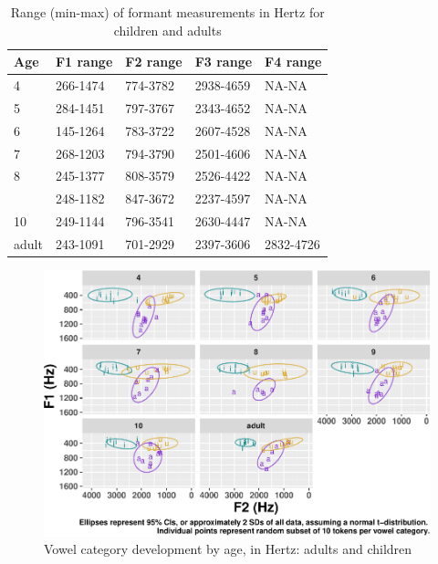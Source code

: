\documentclass[
]{article}
\begin{document}
\begin{table}[!h]

\caption{\label{tab:formant-range-table}Range (min-max) of formant measurements in Hertz for children and adults}
\centering
\begin{tabular}[t]{lllll}
\toprule
Age & F1 range & F2 range & F3 range & F4 range\\
\midrule
4 & 266-1474 & 774-3782 & 2938-4659 & NA-NA\\
5 & 284-1451 & 797-3767 & 2343-4652 & NA-NA\\
6 & 145-1264 & 783-3722 & 2607-4528 & NA-NA\\
7 & 268-1203 & 794-3790 & 2501-4606 & NA-NA\\
8 & 245-1377 & 808-3579 & 2526-4422 & NA-NA\\
\addlinespace
9 & 248-1182 & 847-3672 & 2237-4597 & NA-NA\\
10 & 249-1144 & 796-3541 & 2630-4447 & NA-NA\\
adult & 243-1091 & 701-2929 & 2397-3606 & 2832-4726\\
\bottomrule
\end{tabular}
\end{table}

\begin{figure}
\centering
\includegraphics{3_vtl_results_files/figure-latex/hz-rawdata-plot-1.pdf}
\caption{\label{fig:hz-rawdata-plot}Vowel category development by age, in Hertz: adults and children}
\end{figure}
\end{document}
